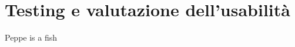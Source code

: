 \chapter{Testing e valutazione dell’usabilità}
\label{cha:Testing e valutazione dell’usabilità}
Peppe is a fish


\lipsum[1-4]